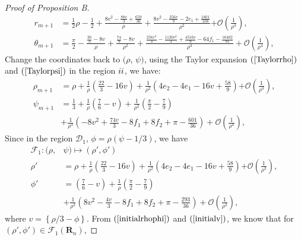 \documentclass{article}
\def \Rtwo{\uppercase\expandafter{\romannumeral2}}
\numberwithin{figure}{section}
\numberwithin{equation}{section}
\theoremstyle{remark}
\theoremstyle{definition}
\begin{document}
\begin{proof}[Proof of Proposition B]
	\begin{equation}
		\begin{split}
			r_{m + 1}& = \frac{1}{2}\rho - \frac{1}{2} + \frac{8v^2-\frac{88v}{3}+\frac{659}{36}}{\rho} + \frac{8v^2 -\frac{256v}{9}-2e_1 +\frac{1801}{108}}{\rho^{2}}\mathcal{+ O}\left( \frac{1}{\rho^{3}} \right),\\
			\theta_{m + 1} &= \frac{\pi}{2} - \frac{\frac{26}{3} - 8v}{\rho} + \frac{\frac{74}{9}-8v}{\rho^{2}} + \frac{\frac{256v^3 }{3}-\frac{1120v^2 }{3}+\frac{4516v}{9}-64f_1 -\frac{16402}{81}}{\rho^{3}} + \mathcal{O}\left( \frac{1}{\rho^{4}} \right),
		\end{split}
	\end{equation}
	Change the coordinates back to \((\rho\), \(\psi)\), using the Taylor expansion $(\ref{Taylorrho})$ and $(\ref{Taylorpsi})$ in the region $\Rtwo$, we have: \begin{equation}
		\begin{split}
			\rho_{m+1} &= \rho + \frac{1}{\rho}\left(\frac{22}{3}-16v\right) + \frac{1}{\rho^{2}}\left(4e_2-4e_1-16v+\frac{58}{9}\right)\mathcal{+ O}\left( \frac{1}{\rho^{3}} \right),\\
			\psi_{m+1}& = \frac{1}{3} + \frac{1}{\rho}\left(\frac{7}{6} - v\right) + \frac{1}{\rho^{2}}\left(\frac{\pi}{2}-\frac{7}{9}\right) \\
            &+ \frac{1}{\rho^{3}}\left(-8v^2+\frac{74v}{3}-8f_1+8f_2+\pi-\frac{601}{36}\right) + \mathcal{O}\left( \frac{1}{\rho^{4}} \right),
		\end{split}
	\end{equation}
    Since in the region $\mathcal{D}_1$, $\phi=\rho(\psi-1/3)$, we have
	\begin{equation}\label{F1}
		\begin{split}
        \mathcal{F}_1:(\rho,&\psi)\mapsto(\rho',\phi')\\
			\rho' &= \rho + \frac{1}{\rho}\left(\frac{22}{3}-16v\right) + \frac{1}{\rho^{2}}\left(4e_2-4e_1-16v+\frac{58}{9}\right)\mathcal{+ O}\left( \frac{1}{\rho^{3}} \right),\\
			\phi'& = \left(\frac{7}{6} - v\right) + \frac{1}{\rho}\left(\frac{\pi}{2}-\frac{7}{9}\right) \\
            &+ \frac{1}{\rho^{2}}\left(8v^2 -\frac{4v}{3}-8f_1 +8f_2 +\pi -\frac{293}{36}\right) + \mathcal{O}\left( \frac{1}{\rho^{3}} \right),
		\end{split}
	\end{equation}
       where $v=\left\{\rho/3-\phi\right\}$. From $(\ref{initialrhophi})$ and $(\ref{initialv})$, we know that for $(\rho',\phi')\in\mathcal{F}_1(\mathbf{R}_n)$,

\end{proof}
\end{document}
